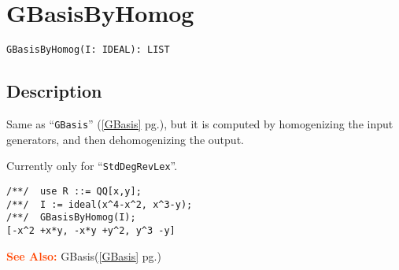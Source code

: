 \documentclass[a4paper]{mybook}
\newenvironment{command}{}{} %
\newcommand\SeeAlso{\par\textcolor{OrangeRed}{\textbf{\large See Also: }}}
\begin{document}
\section{GBasisByHomog}
\label{GBasisByHomog}
\begin{command} %


\begin{Verbatim}[label=syntax, rulecolor=\color{MidnightBlue},
frame=single]
GBasisByHomog(I: IDEAL): LIST
\end{Verbatim}


\subsection*{Description}

Same as ``\verb&GBasis&'' (\ref{GBasis} pg.\pageref{GBasis}), but it is computed by homogenizing the
input generators, and then dehomogenizing the output.
\par 
Currently only for ``\verb&StdDegRevLex&''.
\begin{Verbatim}[label=example, rulecolor=\color{PineGreen}, frame=single]
/**/  use R ::= QQ[x,y];
/**/  I := ideal(x^4-x^2, x^3-y);
/**/  GBasisByHomog(I);
[-x^2 +x*y, -x*y +y^2, y^3 -y]
\end{Verbatim}


\SeeAlso %
  GBasis(\ref{GBasis} pg.\pageref{GBasis})
\end{command} %
\end{document}
